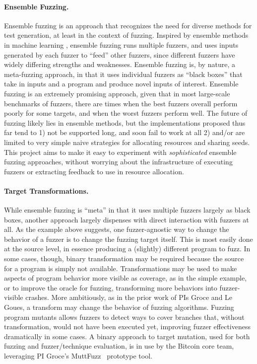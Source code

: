\paragraph{Ensemble Fuzzing.}   Ensemble fuzzing \cite{chen2019enfuzz,ensemble,pastis} is an 
approach that recognizes the need for
diverse methods for test generation, at least in the context of
fuzzing.   Inspired by ensemble methods in machine learning 
\cite{dietterich2002ensemble},
ensemble fuzzing runs multiple fuzzers, and uses inputs generated by
each fuzzer to ``feed'' other fuzzers, since different fuzzers have widely 
differing strengths and weaknesses. Ensemble fuzzing is, by nature, a 
meta-fuzzing approach, in that it uses individual fuzzers as ``black boxes'' 
that take in inputs and a program and produce novel inputs of interest.  
Ensemble fuzzing is an extremely promising approach, given that in most 
large-scale benchmarks of fuzzers, there are times when the best fuzzers 
overall perform poorly for some targets, and when the worst fuzzers perform 
well.  The future of fuzzing likely lies in ensemble methods, but the 
implementations proposed thus far tend to 1) not be supported long, and soon 
fail to work at all 2) and/or are limited to very simple naive strategies for 
allocating resources and sharing seeds. This
project aims to make it easy to 
experiment with \emph{sophisticated} ensemble fuzzing approaches, without 
worrying about the infrastructure of executing fuzzers or extracting feedback 
to use in resource allocation.

\paragraph{Target Transformations.}  While ensemble fuzzing is ``meta'' in that 
it uses multiple fuzzers largely as black boxes, another approach largely 
dispenses with direct interaction with fuzzers at all.  As the example above 
suggests, one fuzzer-agnostic way to change the behavior of a fuzzer is to 
change the fuzzing target itself.  This is most easily done at the source 
level, in essence producing a (slightly) different program to fuzz.  In some 
cases, though, binary transformation may be required because the
source for a program is simply not available.   Transformations may be used to make aspects of 
program behavior more visible as coverage, as in the simple example, or to 
improve the oracle for fuzzing, transforming more behaviors into fuzzer-visible 
crashes.  More ambitiously, as in the prior work of PIs Groce and Le Goues, a 
transform may change the behavior of fuzzing algorithms.  Fuzzing program 
mutants allows fuzzers to detect ways to cover branches that, without 
transformation, would not have been executed yet, improving fuzzer 
effectiveness dramatically in some cases.  A binary approach to target
mutation, used for both fuzzing and fuzzer/technique evaluation, is in
use by the Bitcoin core team, leveraging PI Groce's MuttFuzz~\cite{muttfuzz} prototype tool.

